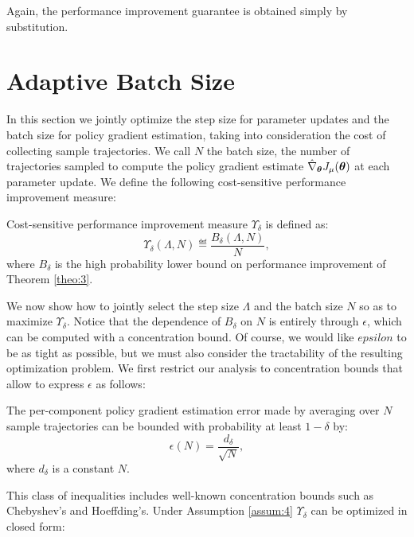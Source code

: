Again, the performance improvement guarantee is obtained simply by substitution.



\section{Adaptive Batch Size}\label{sec:batchsize}
In this section we jointly optimize the step size for parameter updates and the batch size for policy gradient estimation, taking into consideration the cost of collecting sample trajectories.
We call $N$ the batch size, \ie the number of trajectories sampled to compute the policy gradient estimate $\hat{\nabla}_{\boldsymbol{\theta}}J_{\mu}(\boldsymbol{\theta})$ at each parameter update.
We define the following cost-sensitive performance improvement measure:
\begin{definition}\label{def:1}
Cost-sensitive performance improvement measure $\Upsilon_{\delta}$ is defined as:
\[
\Upsilon_{\delta}(\Lambda,N)\eqdef \frac{B_{\delta}(\Lambda,N)}{N}, 
\]
where $B_{\delta}$ is the high probability lower bound on performance improvement of Theorem \ref{theo:3}.
\end{definition}

We now show how to jointly select the step size $\Lambda$ and the batch size $N$ so as to maximize $\Upsilon_{\delta}$.
Notice that the dependence of $B_{\delta}$ on $N$ is entirely through $\epsilon$, which can be computed with a concentration bound. Of course, we would like $epsilon$ to be as tight as possible, but we must also consider the tractability of the resulting optimization problem. 
We first restrict our analysis to concentration bounds that allow to express $\epsilon$ as follows:
\begin{assumption}\label{assum:4}
The per-component policy gradient estimation error made by averaging over $N$ sample trajectories can be bounded with probability at least $1-\delta$ by:
\[
	\epsilon(N) = \frac{d_\delta}{\sqrt{N}},
\]
where $d_\delta$ is a constant \wrt $N$.
\end{assumption}
This class of inequalities includes well-known concentration bounds such as Chebyshev's and Hoeffding's.
Under Assumption \ref{assum:4} $\Upsilon_\delta$ can be optimized in closed form:

